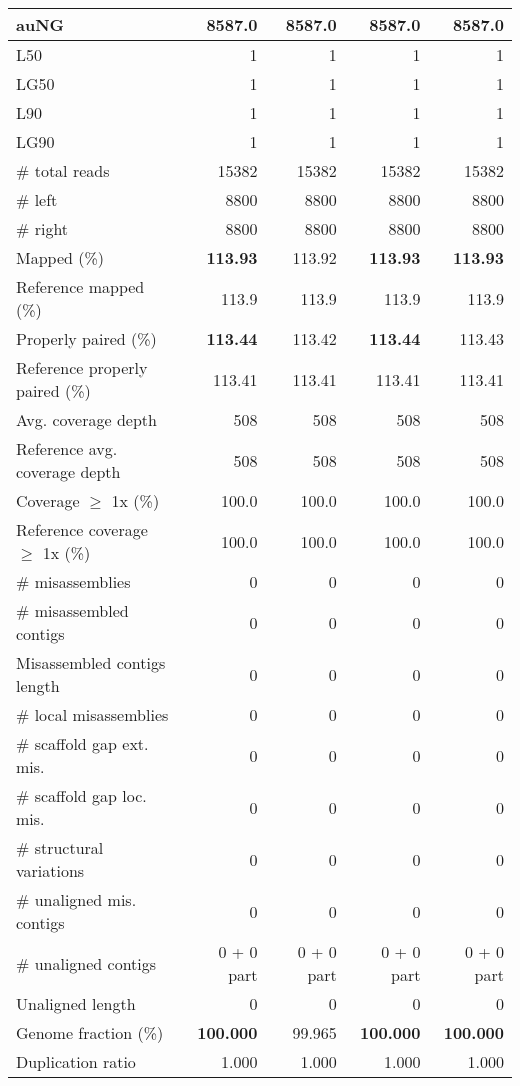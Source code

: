 \documentclass[12pt,a4paper]{article}
\begin{document}
\begin{table}[ht]
\begin{center}
\begin{tabular}{|l*{4}{|r}|}
auNG & 8587.0 & 8587.0 & 8587.0 & 8587.0 \\ \hline
L50 & 1 & 1 & 1 & 1 \\ \hline
LG50 & 1 & 1 & 1 & 1 \\ \hline
L90 & 1 & 1 & 1 & 1 \\ \hline
LG90 & 1 & 1 & 1 & 1 \\ \hline
\# total reads & 15382 & 15382 & 15382 & 15382 \\ \hline
\# left & 8800 & 8800 & 8800 & 8800 \\ \hline
\# right & 8800 & 8800 & 8800 & 8800 \\ \hline
Mapped (\%) & {\bf 113.93} & 113.92 & {\bf 113.93} & {\bf 113.93} \\ \hline
Reference mapped (\%) & 113.9 & 113.9 & 113.9 & 113.9 \\ \hline
Properly paired (\%) & {\bf 113.44} & 113.42 & {\bf 113.44} & 113.43 \\ \hline
Reference properly paired (\%) & 113.41 & 113.41 & 113.41 & 113.41 \\ \hline
Avg. coverage depth & 508 & 508 & 508 & 508 \\ \hline
Reference avg. coverage depth & 508 & 508 & 508 & 508 \\ \hline
Coverage $\geq$ 1x (\%) & 100.0 & 100.0 & 100.0 & 100.0 \\ \hline
Reference coverage $\geq$ 1x (\%) & 100.0 & 100.0 & 100.0 & 100.0 \\ \hline
\# misassemblies & 0 & 0 & 0 & 0 \\ \hline
\# misassembled contigs & 0 & 0 & 0 & 0 \\ \hline
Misassembled contigs length & 0 & 0 & 0 & 0 \\ \hline
\# local misassemblies & 0 & 0 & 0 & 0 \\ \hline
\# scaffold gap ext. mis. & 0 & 0 & 0 & 0 \\ \hline
\# scaffold gap loc. mis. & 0 & 0 & 0 & 0 \\ \hline
\# structural variations & 0 & 0 & 0 & 0 \\ \hline
\# unaligned mis. contigs & 0 & 0 & 0 & 0 \\ \hline
\# unaligned contigs & 0 + 0 part & 0 + 0 part & 0 + 0 part & 0 + 0 part \\ \hline
Unaligned length & 0 & 0 & 0 & 0 \\ \hline
Genome fraction (\%) & {\bf 100.000} & 99.965 & {\bf 100.000} & {\bf 100.000} \\ \hline
Duplication ratio & 1.000 & 1.000 & 1.000 & 1.000 \\ \hline

\end{tabular}
\end{center}
\end{table}
\end{document}
